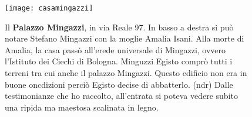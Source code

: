 \newpage

 \begin{figure}[htb]
    \centering
    \texttt{[image: casamingazzi]}
    \caption*{Il \textbf{Palazzo Mingazzi}, in via Reale 97. In basso a destra si può notare Stefano Mingazzi con la moglie Amalia Isani. Alla morte di Amalia, la casa passò all'erede universale di Mingazzi, ovvero l'Istituto dei Ciechi di Bologna. Minguzzi Egisto comprò tutti i terreni tra cui anche il palazzo Mingazzi. Questo edificio non era in buone oncdizioni perciò Egisto decise di abbatterlo. (ndr) Dalle testimonianze che ho raccolto, all'entrata si poteva vedere subito una ripida ma maestosa scalinata in legno.\label{fig:casamingazzi}}
\end{figure}



































%